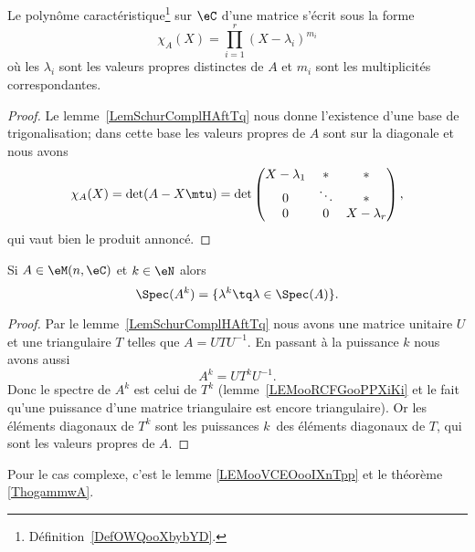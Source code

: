 \begin{corollary}   \label{CorUNZooAZULXT}
	Le polynôme caractéristique\footnote{Définition~\ref{DefOWQooXbybYD}.} sur \( \eC\) d'une matrice s'écrit sous la forme
	\begin{equation}
		\chi_A(X)=\prod_{i=1}^r(X-\lambda_i)^{m_i}
	\end{equation}
	où les \( \lambda_i\) sont les valeurs propres distinctes de \( A\) et \( m_i\) sont les multiplicités correspondantes.
\end{corollary}

\begin{proof}
	Le lemme~\ref{LemSchurComplHAftTq} nous donne l'existence d'une base de trigonalisation; dans cette base les valeurs propres de \( A\) sont sur la diagonale et nous avons
	\begin{equation}
		\chi_A(X)=\det(A-X\mtu)=\det\begin{pmatrix}
			X-\lambda_1 & *      & *           \\
			0           & \ddots & *           \\
			0           & 0      & X-\lambda_r
		\end{pmatrix},
	\end{equation}
	qui vaut bien le produit annoncé.
\end{proof}

\begin{corollary}       \label{CORooTPDHooXazTuZ}
	Si \( A\in \eM(n,\eC)\) et \( k\in \eN\) alors
	\begin{equation}
		\Spec(A^k)=\{ \lambda^k\tq \lambda\in \Spec(A) \}.
	\end{equation}
\end{corollary}

\begin{proof}
	Par le lemme~\ref{LemSchurComplHAftTq} nous avons une matrice unitaire \( U\) et une triangulaire \( T\) telles que \( A=UTU^{-1}\). En passant à la puissance \( k\) nous avons aussi
	\begin{equation}
		A^k=UT^kU^{-1}.
	\end{equation}
	Donc le spectre de \( A^k\) est celui de \( T^k\) (lemme~\ref{LEMooRCFGooPPXiKi} et le fait qu'une puissance d'une matrice triangulaire est encore triangulaire). Or les éléments diagonaux de \( T^k\) sont les puissances \( k\)\ieme\ des éléments diagonaux de \( T\), qui sont les valeurs propres de \( A\).
\end{proof}
Pour le cas complexe, c'est le lemme \ref{LEMooVCEOooIXnTpp} et le théorème \ref{ThogammwA}.

